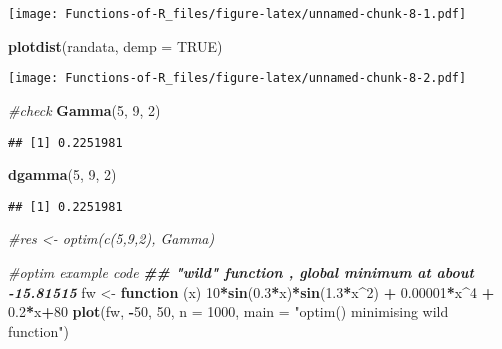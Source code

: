 \documentclass[
]{article}
\newenvironment{Shaded}{\begin{snugshade}}{\end{snugshade}}
\newcommand{\AttributeTok}[1]{\textcolor[rgb]{0.13,0.29,0.53}{#1}}
\newcommand{\CommentTok}[1]{\textcolor[rgb]{0.56,0.35,0.01}{\textit{#1}}}
\newcommand{\ConstantTok}[1]{\textcolor[rgb]{0.56,0.35,0.01}{#1}}
\newcommand{\ControlFlowTok}[1]{\textcolor[rgb]{0.13,0.29,0.53}{\textbf{#1}}}
\newcommand{\DecValTok}[1]{\textcolor[rgb]{0.00,0.00,0.81}{#1}}
\newcommand{\DocumentationTok}[1]{\textcolor[rgb]{0.56,0.35,0.01}{\textbf{\textit{#1}}}}
\newcommand{\FloatTok}[1]{\textcolor[rgb]{0.00,0.00,0.81}{#1}}
\newcommand{\FunctionTok}[1]{\textcolor[rgb]{0.13,0.29,0.53}{\textbf{#1}}}
\newcommand{\NormalTok}[1]{#1}
\newcommand{\OtherTok}[1]{\textcolor[rgb]{0.56,0.35,0.01}{#1}}
\newcommand{\SpecialCharTok}[1]{\textcolor[rgb]{0.81,0.36,0.00}{\textbf{#1}}}
\newcommand{\StringTok}[1]{\textcolor[rgb]{0.31,0.60,0.02}{#1}}
\begin{document}
\texttt{[image: Functions-of-R\_files/figure-latex/unnamed-chunk-8-1.pdf]}

\begin{Shaded}
\begin{Highlighting}[]
\FunctionTok{plotdist}\NormalTok{(randata, }\AttributeTok{demp =} \ConstantTok{TRUE}\NormalTok{)}
\end{Highlighting}
\end{Shaded}

\texttt{[image: Functions-of-R\_files/figure-latex/unnamed-chunk-8-2.pdf]}

\begin{Shaded}
\begin{Highlighting}[]
\CommentTok{\#check}
\FunctionTok{Gamma}\NormalTok{(}\DecValTok{5}\NormalTok{, }\DecValTok{9}\NormalTok{, }\DecValTok{2}\NormalTok{)}
\end{Highlighting}
\end{Shaded}

\begin{verbatim}
## [1] 0.2251981
\end{verbatim}

\begin{Shaded}
\begin{Highlighting}[]
\FunctionTok{dgamma}\NormalTok{(}\DecValTok{5}\NormalTok{, }\DecValTok{9}\NormalTok{, }\DecValTok{2}\NormalTok{)}
\end{Highlighting}
\end{Shaded}

\begin{verbatim}
## [1] 0.2251981
\end{verbatim}

\begin{Shaded}
\begin{Highlighting}[]
\CommentTok{\#res \textless{}{-} optim(c(5,9,2), Gamma)}
\end{Highlighting}
\end{Shaded}

\begin{Shaded}
\begin{Highlighting}[]
\CommentTok{\#optim example code}
\DocumentationTok{\#\# "wild" function , global minimum at about {-}15.81515}
\NormalTok{fw }\OtherTok{\textless{}{-}} \ControlFlowTok{function}\NormalTok{ (x)}
    \DecValTok{10}\SpecialCharTok{*}\FunctionTok{sin}\NormalTok{(}\FloatTok{0.3}\SpecialCharTok{*}\NormalTok{x)}\SpecialCharTok{*}\FunctionTok{sin}\NormalTok{(}\FloatTok{1.3}\SpecialCharTok{*}\NormalTok{x}\SpecialCharTok{\^{}}\DecValTok{2}\NormalTok{) }\SpecialCharTok{+} \FloatTok{0.00001}\SpecialCharTok{*}\NormalTok{x}\SpecialCharTok{\^{}}\DecValTok{4} \SpecialCharTok{+} \FloatTok{0.2}\SpecialCharTok{*}\NormalTok{x}\SpecialCharTok{+}\DecValTok{80}
\FunctionTok{plot}\NormalTok{(fw, }\SpecialCharTok{{-}}\DecValTok{50}\NormalTok{, }\DecValTok{50}\NormalTok{, }\AttributeTok{n =} \DecValTok{1000}\NormalTok{, }\AttributeTok{main =} \StringTok{"optim() minimising \textquotesingle{}wild function\textquotesingle{}"}\NormalTok{)}
\end{Highlighting}
\end{Shaded}
\end{document}
